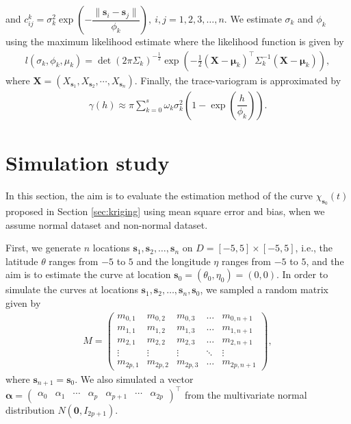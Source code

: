 \documentclass[12pt]{interact}
\theoremstyle{plain}%
\theoremstyle{definition}
\theoremstyle{remark}
\begin{document}
and \(c_{ij}^k = \sigma_k^2 \exp \left( -\dfrac{\lVert \bm{s}_i -\bm{s}_j\rVert}{\phi_k} \right),\ i,j=1,2,3,\dots, n\).
We estimate \(\sigma_k\) and \(\phi_k\) using the maximum likelihood estimate where the likelihood function is given by
\begin{align*}
l(\sigma_k, \phi_k, \mu_k) = \det (2 \pi \Sigma_k)^{-\frac{1}{2}} \exp \left(  -\frac{1}{2} (\bm{X}-\bm{\mu}_k)^\top \Sigma_k^{-1} (\bm{X}-\bm{\mu}_k) \right),
\end{align*}
where \(\bm{X} = \left( X_{\bm{s}_1}, X_{\bm{s}_2}, \cdots, X_{\bm{s}_n} \right)\). Finally, the trace-variogram is approximated by
\begin{align*}
\gamma(h) \approx \pi \sum_{k=0}^{s} \omega_k \sigma_k^2\left(1- \exp \left( \dfrac{h}{\phi_k} \right) \right).
\end{align*}

\section{Simulation study}\label{sec:simulation}

In this section, the aim is to evaluate the estimation method of the curve \(\chi_{\bm{s}_0}(t)\) proposed in Section \ref{sec:kriging} using mean square error and bias, when we assume normal dataset and non-normal dataset.

First, we generate \(n\) locations \(\bm{s}_1, \bm{s}_2, \dots, \bm{s}_n\) on \(D=[-5,5]\times [-5,5]\), i.e., the latitude \(\theta\) ranges from \(-5\) to \(5\) and the longitude \(\eta\) ranges from \(-5\) to \(5\),
and the aim is to estimate the curve at location \(\bm{s}_0=(\theta_0, \eta_0) = (0,0)\). In order to simulate the curves at locations \(\bm{s}_1, \bm{s}_2, \dots, \bm{s}_n, \bm{s}_0\), we sampled a random matrix given by
\begin{align}
M =
\begin{pmatrix}
m_{0,1} & m_{0,2} & m_{0,3} & \dots & m_{0,n+1}\\
m_{1,1} & m_{1,2} & m_{1,3} & \dots & m_{1,n+1}\\
m_{2,1} & m_{2,2} & m_{2,3} & \dots & m_{2,n+1}\\
\vdots  & \vdots  & \vdots  & \ddots& \vdots   \\
m_{2p,1} & m_{2p,2} & m_{2p,3} & \dots & m_{2p,n+1}
\end{pmatrix},
\label{eq:matrix-simulation}
\end{align}
where \(\bm{s}_{n+1} = \bm{s}_0\). We also simulated a vector \(\bm{\alpha}=\begin{pmatrix} \alpha_0 & \alpha_1 & \cdots & \alpha_p & \alpha_{p+1} & \cdots & \alpha_{2p} \end{pmatrix}^\top\) from the multivariate
normal distribution \(N(\bm{0}, I_{2p+1})\).
\end{document}
